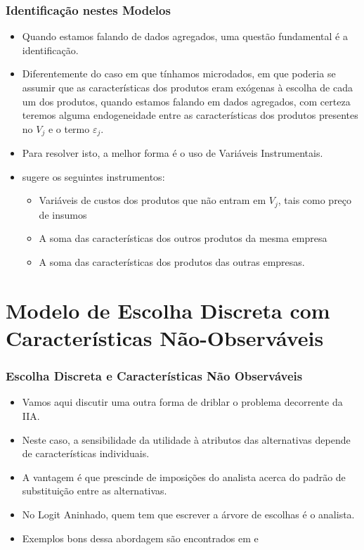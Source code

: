 \documentclass{beamer}
\begin{document}
\begin{frame}\frametitle{Identificação nestes Modelos}

\begin{itemize}
\item Quando estamos falando de dados agregados, uma questão fundamental
é a identificação.
\item Diferentemente do caso em que tínhamos microdados, em que poderia
se assumir que as características dos produtos eram exógenas à escolha
de cada um dos produtos, quando estamos falando em dados agregados,
com certeza teremos alguma endogeneidade entre as características
dos produtos presentes no $V_{j}$ e o termo $\varepsilon_{j}$.
\item Para resolver isto, a melhor forma é o uso de Variáveis Instrumentais.
\item \citet{Berry1994} sugere os seguintes instrumentos:

\begin{itemize}
\item Variáveis de custos dos produtos que não entram em $V_{j}$, tais
como preço de insumos
\item A soma das características dos outros produtos da mesma empresa
\item A soma das características dos produtos das outras empresas.
\end{itemize}
\end{itemize}

\end{frame}

\section{Modelo de Escolha Discreta com Características Não-Observáveis}
\begin{frame}\frametitle{Escolha Discreta e Características Não Observáveis}

\begin{itemize}
\item Vamos aqui discutir uma outra forma de driblar o problema decorrente
da IIA.
\item Neste caso, a sensibilidade da utilidade à atributos das alternativas
depende de características individuais.
\item A vantagem é que prescinde de imposições do analista acerca do padrão
de substituição entre as alternativas.
\item No Logit Aninhado, quem tem que escrever a árvore de escolhas é o
analista.
\item Exemplos bons dessa abordagem são encontrados em \citet{Verboven1996} e \citet{Goldberg1998}
\end{itemize}
\end{frame}
\end{document}
